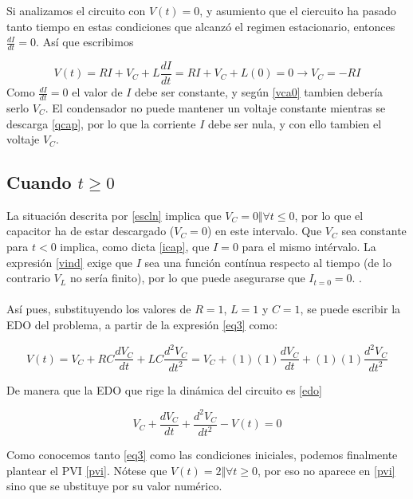 \documentclass[letterpaper,12pt]{article} %
\begin{document}
Si analizamos el circuito con $V(t)=0$, y asumiento que el ciercuito ha pasado tanto tiempo en estas condiciones que alcanzó el regimen estacionario, entonces $\frac{dI}{dt}=0$. Así que escribimos

\begin{equation}
V(t)=RI+V_C+L\frac{dI}{dt}=RI+V_C+L(0)=0\longrightarrow V_C=-RI
\label{vca0}
\end{equation}
 Como $\frac{dI}{dt}=0$ el valor de $I$ debe ser constante, y según \eqref{vca0} tambien debería serlo $V_C$. El condensador no puede mantener un voltaje constante mientras se descarga \eqref{qcap}, por lo que la corriente $I$ debe ser nula, y con ello tambien el voltaje $V_C$.
 
\subsection*{Cuando $t\geq0$}





La situación descrita por \eqref{escln} implica que $V_C=0\Vert\forall  t\leq 0$, por lo que el capacitor ha de estar descargado ($V_C=0$) en este intervalo. Que $V_C$ sea constante para $t<0$ implica, como dicta \eqref{icap}, que $I=0$ para el mismo intérvalo. La expresión \eqref{vind} exige que $I$ sea una función contínua respecto al tiempo (de lo contrario $V_L$ no sería finito), por lo que puede asegurarse que $I_{t=0}=0$. .\\ \\ 

Así pues, substituyendo los valores de $R=1$, $L=1$ y $C=1$, se puede escribir la EDO del problema, a partir de la expresión  \eqref{eq3} como:

\begin{equation*}
V(t)=V_C + RC\frac{dV_C}{dt} + LC\frac{d^2V_C}{dt^2}=V_C + (1)(1)\frac{dV_C}{dt} + (1)(1)\frac{d^2V_C}{dt^2}
\end{equation*}

De manera que la EDO que rige la dinámica del circuito es \eqref{edo}

\begin{equation}
V_C + \frac{dV_C}{dt} + \frac{d^2V_C}{dt^2}-V(t)=0
\label{edo}
\end{equation}

 Como conocemos tanto \eqref{eq3} como las condiciones iniciales, podemos finalmente plantear el PVI \eqref{pvi}. Nótese que $V(t)=2 \Vert \forall  t\geq 0$, por eso no aparece en \eqref{pvi} sino que se ubstituye por su valor numérico.\\ 
\end{document}
